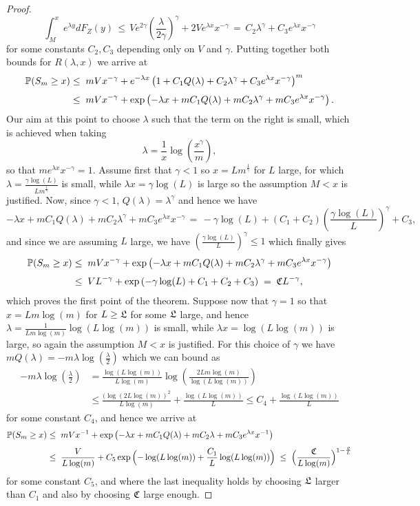 \begin{proof}
\[\int_M^xe^{\lambda y}dF_Z(y)\,\leq\,Ve^{2\gamma}\left(\frac{\lambda}{2\gamma}\right)^{\gamma}+ 2Ve^{\lambda x}x^{-\gamma}\,=\,C_2\lambda^{\gamma}+C_3e^{\lambda x}x^{-\gamma}\]
for some constants $C_2, C_3$ depending only on $V$ and $\gamma$. Putting together both bounds for $R(\lambda,x)$ we arrive at
\begin{align*}\mathbb{P}(S_m\geq x)&\leq\;mVx^{-\gamma}+e^{-\lambda x}\left(1+C_1Q(\lambda)+C_2\lambda^{\gamma}+ C_3e^{\lambda x}x^{-\gamma}\right)^m\\[3pt]
&\leq\;mVx^{-\gamma}+\exp\left(-\lambda x+mC_1Q(\lambda)+mC_2\lambda^{\gamma}+ mC_3e^{\lambda x}x^{-\gamma}\right).
\end{align*}
Our aim at this point to choose $\lambda$ such that the term on the right is small, which is achieved when taking
\[\lambda=\frac{1}{x}\log\left(\frac{x^{\gamma}}{m}\right),\]
so that $me^{\lambda x}x^{-\gamma}=1$. Assume first that $\gamma<1$ so $x=Lm^{\frac{1}{\gamma}}$ for $L$ large, for which $\lambda=\frac{\gamma\log(L)}{Lm^{\frac{1}{\gamma}}}$ is small, while $\lambda x=\gamma\log(L)$ is large so the assumption $M<x$ is justified. Now, since $\gamma<1$, $Q(\lambda)=\lambda^{\gamma}$ and hence we have
\[-\lambda x+mC_1Q(\lambda)+mC_2\lambda^{\gamma}+ mC_3e^{\lambda x}x^{-\gamma}\,=\,-\gamma\log(L)+(C_1+C_2)\left(\frac{\gamma\log(L)}{L}\right)^{\gamma}+C_3,\]
and since we are assuming $L$ large, we have $(\frac{\gamma\log(L)}{L})^{\gamma}\leq 1$ which finally gives
\begin{align*}\mathbb{P}(S_m\geq x)&\leq\;mVx^{-\gamma}+\exp\left(-\lambda x+mC_1Q(\lambda)+mC_2\lambda^{\gamma}+ mC_3e^{\lambda x}x^{-\gamma}\right)\\[3pt]
&\leq\;VL^{-\gamma}+\exp\left(-\gamma\log(L)+C_1+C_2+C_3\right)\;=\;\mathfrak{C} L^{-\gamma},
\end{align*}
which proves the first point of the theorem. Suppose now that $\gamma=1$ so that $x=Lm\log(m)$ for $L\geq \mathfrak{L}$ for some $\mathfrak{L}$ large, and hence $\lambda=\frac{1}{Lm\log(m)}\log(L\log(m))$ is small, while $\lambda x=\log(L\log(m))$ is large, so again the assumption $M<x$ is justified. For this choice of $\gamma$ we have $mQ(\lambda)=-m\lambda\log(\frac{\lambda}{2})$ which we can bound as 
\begin{align*}
-m\lambda\log(\tfrac{\lambda}{2})&=\frac{\log(L\log(m))}{L\log(m)}\log\left(\frac{2Lm\log(m)}{\log(L\log(m))}\right)\\[3pt]&\leq\frac{(\log(2L\log(m))^2}{L\log(m)}+\frac{\log(L\log(m))}{L}\leq C_4+\frac{\log(L\log(m))}{L}
\end{align*}
for some constant $C_4$, and hence we arrive at
\begin{align*}\mathbb{P}(S_m\geq x)&\leq\;mVx^{-1}+\exp\left(-\lambda x+mC_1Q(\lambda)+mC_2\lambda+ mC_3e^{\lambda x}x^{-1}\right)\\[3pt]
&\leq\;\frac{V}{L\log(m)}+C_5\exp\Big({-}\log(L\log(m))+\frac{C_1}{L}\log(L\log(m))\Big)\;\leq\;\Big(\frac{\mathfrak{C}}{L\log(m)}\Big)^{1-\frac{\mathfrak{L}}{L}}
\end{align*}
for some constant $C_5$, and where the last inequality holds by choosing $\mathfrak{L}$ larger than $C_1$ and also by choosing $\mathfrak{C}$ large enough.


\end{proof}

